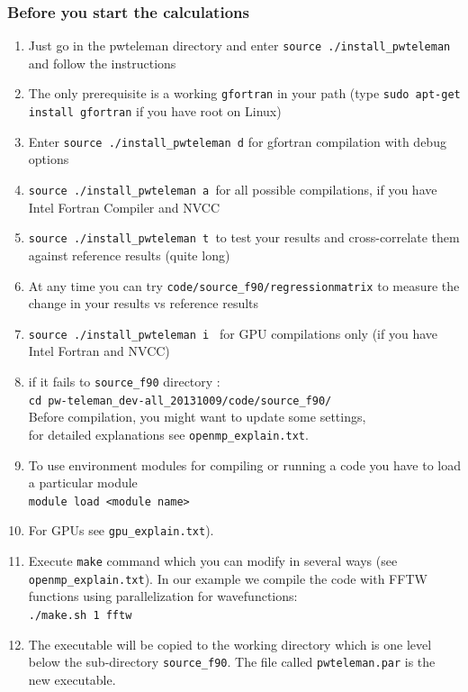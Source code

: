 \documentclass[10pt]{beamer}
\begin{document}
\begin{frame}
\frametitle{Before you start the calculations}
\begin{enumerate}
\item Just go in the pwteleman directory and enter {\tt source ./install\_pwteleman} and follow the instructions
\item The only prerequisite is a working {\tt gfortran} in your path (type  {\tt sudo apt-get install gfortran} if you have root on Linux)
\item Enter {\tt source ./install\_pwteleman d} for gfortran compilation with debug options 
\item  {\tt source ./install\_pwteleman a }for all possible compilations, if you have Intel Fortran Compiler and NVCC 
\item   {\tt source ./install\_pwteleman t }to test your results and cross-correlate them against reference results  (quite long) 
\item  At any time you can try {\tt code/source\_f90/regressionmatrix} to measure the change in your results vs reference results 
\item   {\tt source ./install\_pwteleman i } for GPU compilations only (if you have Intel Fortran and NVCC) 
\item if it fails  to {\tt source\_f90} directory :\\
\vspace*{0.2cm}
{\tt cd pw-teleman\_dev-all\_20131009/code/source\_f90/}\\
\vspace*{0.2cm}
Before compilation, you might want to update some settings,\\ for detailed explanations see {\tt openmp\_explain.txt}.
\vspace*{0.2cm}
\item To use environment modules for compiling or running a code you have to load a particular module\\
\vspace*{0.2cm}
{\tt module load <module name>}
\vspace*{0.2cm}
\item For GPUs see {\tt gpu\_explain.txt}).
\item Execute {\tt make} command which you can modify in several ways (see {\tt openmp\_explain.txt}). In our example we compile the code with FFTW functions using parallelization for wavefunctions:\\
\vspace*{0.2cm}
\vspace*{0.2cm}
{\tt ./make.sh 1 fftw} 
\vspace*{0.2cm}
\item The executable will be copied to the working
 directory which is one level below the sub-directory {\tt source\_f90}. The file called {\tt pwteleman.par} is the new executable.
\end{enumerate} 
\end{frame}
\end{document}
